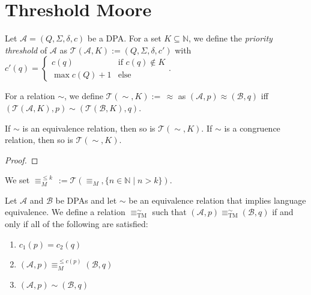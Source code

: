 \section{Threshold Moore}
\begin{defn}
	Let $\mathcal{A} = (Q, \Sigma, \delta, c)$ be a DPA. For a set $K \subseteq \mathbb{N}$, we define the \emph{priority threshold} of $\mathcal{A}$ as $\mathcal{T}(\mathcal{A}, K) := (Q, \Sigma, \delta, c')$ with $c'(q) = \begin{cases} c(q) & \text{if } c(q) \notin K \\ \max c(Q) + 1 & \text{else} \end{cases}$.
	
	For a relation $\sim$, we define $\mathcal{T}(\sim, K) :=\, \approx$ as $(\mathcal{A}, p) \approx (\mathcal{B}, q)$ iff $(\mathcal{T}(\mathcal{A}, K), p) \sim (\mathcal{T}(\mathcal{B}, K), q)$.
\end{defn}

\begin{lem}
	If $\sim$ is an equivalence relation, then so is $\mathcal{T}(\sim, K)$. If $\sim$ is a congruence relation, then so is $\mathcal{T}(\sim, K)$.
\end{lem}

\begin{proof}
\end{proof}

\begin{defn}
	We set $\equiv_M^{\leq k} \,:= \mathcal{T}(\equiv_M, \{ n \in \mathbb{N} \mid n > k \})$.
\end{defn}

\vspace{5pt}

\begin{defn}
	Let $\mathcal{A}$ and $\mathcal{B}$ be DPAs and let $\sim$ be an equivalence relation that implies language equivalence. We define a relation $\equiv_\text{TM}^\sim$ such that $(\mathcal{A}, p) \equiv^\sim_\text{TM} (\mathcal{B}, q)$ if and only if all of the following are satisfied:
	\begin{enumerate}
		\item $c_1(p) = c_2(q)$
		\item $(\mathcal{A}, p) \equiv_M^{\leq c(p)} (\mathcal{B}, q)$
		\item $(\mathcal{A}, p) \sim (\mathcal{B}, q)$
	\end{enumerate}
\end{defn}

\vspace{5pt}

